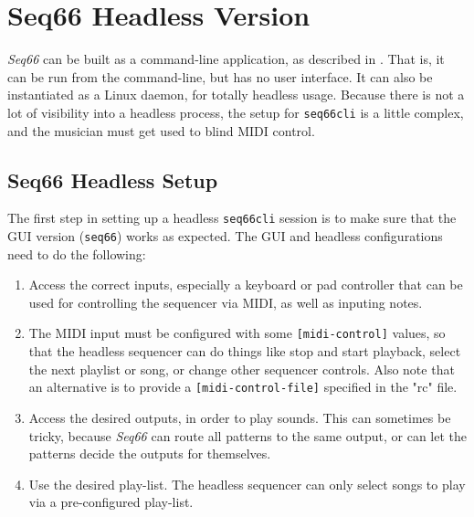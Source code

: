 %
%
%

\section{Seq66 Headless Version}
\label{sec:headless}

   \textsl{Seq66} can be built as a command-line application,
   as described in .
   That is, it can be run from the command-line, but has no user interface.
   It can also be instantiated as a Linux daemon, for totally headless usage.
   Because there is not a lot of visibility into a headless process, the
   setup for \texttt{seq66cli} is a little complex, and the musician must get
   used to blind MIDI control.

\subsection{Seq66 Headless Setup}
\label{subsec:headless_setup}

   The first step in setting up a headless \texttt{seq66cli} session is
   to make sure that the GUI version (\texttt{seq66}) works as expected.
   The GUI and headless configurations need to do the following:
   
   \begin{enumerate}
      \item Access the correct inputs, especially a keyboard or pad controller
         that can be used for controlling the sequencer via MIDI, as well as
         inputing notes.
      \item The MIDI input must be configured with some \texttt{[midi-control]}
         values, so that the headless sequencer can do things like stop and
         start playback, select the next playlist or song, or change other
         sequencer controls.  Also note that an alternative is to provide a 
         \texttt{[midi-control-file]} specified in the "rc" file.
      \item Access the desired outputs, in order to play sounds.  This can
         sometimes be tricky, because \textsl{Seq66} can route all
         patterns to the same output, or can let the patterns decide the
         outputs for themselves.
      \item Use the desired play-list.  The headless sequencer can only select
         songs to play via a pre-configured play-list.
   \end{enumerate}

